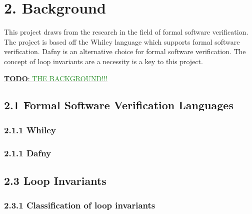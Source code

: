 \documentclass[11pt, a4paper, twoside, openright]{report}
\newcommand{\todo}[1]{\huge{\underline{\textbf{\textcolor{RubineRed}{TODO}}: \textcolor{ForestGreen}{#1}}}\normalsize }
\begin{document}
\section*{2. Background}

This project draws from the research in the field of formal software verification.
The project is based off the Whiley language which supports formal software
verification. Dafny is an alternative choice for formal software verification.
The concept of loop invariants are a necessity is a key to this project.

\todo{THE BACKGROUND!!!}

\subsection*{2.1 Formal Software Verification Languages}

\subsubsection*{2.1.1 Whiley}
\cite{whiley-origin}
\cite{whiley-design}

\subsubsection*{2.1.1 Dafny}
\cite{dafny-started}


\subsection*{2.3 Loop Invariants}
%

\subsubsection*{2.3.1 Classification of loop invariants}
\end{document}
